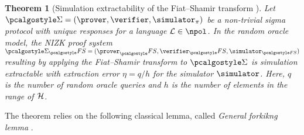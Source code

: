 \documentclass[runningheads,11pt]{llncs}
\newtheorem{theorem}{Theorem}%
\theoremstyle{definition}
\begin{document}
\begin{theorem}[Simulation extractability of the Fiat--Shamir transform \cite{INDOCRYPT:FKMV12}]
	Let $\sigmaprot = (\prover, \verifier, \simulator_\zkproof)$ be a non-trivial sigma protocol with unique responses for a language $\LANG \in \npol$.
	In the random oracle model, the NIZK proof system $\sigmaprot_\fs = (\prover_\fs, \verifier_\fs, \simulator_{\fs})$ resulting by applying the Fiat--Shamir transform to $\sigmaprot$ is simulation extractable with extraction error $\eta = q/h$ for the simulator $\simulator$. Here, $q$ is the number of random oracle queries and $h$ is the number of elements in the range of $\mathcal{H}$.
\end{theorem}

The theorem relies on the following classical lemma, called \emph{General forkikng lemma} \cite{JC:PoiSte00}.
%
\end{document}
